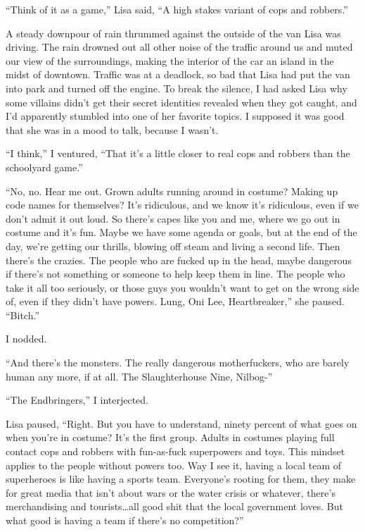 





``Think of it as a game,'' Lisa said, ``A high stakes variant of cops and robbers.''



A steady downpour of rain thrummed against the outside of the van Lisa was driving.  The rain drowned out all other noise of the traffic around us and muted our view of the surroundings, making the interior of the car an island in the midst of downtown.  Traffic was at a deadlock, so bad that Lisa had put the van into park and turned off the engine.  To break the silence, I had asked Lisa why some villains didn't get their secret identities revealed when they got caught, and I'd apparently stumbled into one of her favorite topics.  I supposed it was good that she was in a mood to talk, because I wasn't.



``I think,'' I ventured, ``That it's a little closer to real cops and robbers than the schoolyard game.''



``No, no.  Hear me out.  Grown adults running around in costume?  Making up code names for themselves?  It's ridiculous, and we know it's ridiculous, even if we don't admit it out loud.  So there's capes like you and me, where we go out in costume and it's fun.  Maybe we have some agenda or goals, but at the end of the day, we're getting our thrills, blowing off steam and living a second life.  Then there's the crazies.  The people who are fucked up in the head, maybe dangerous if there's not something or someone to help keep them in line.  The people who take it all too seriously, or those guys you wouldn't want to get on the wrong side of, even if they didn't have powers.  Lung, Oni Lee, Heartbreaker,'' she paused.  ``Bitch.''



I nodded.



``And there's the monsters.  The really dangerous motherfuckers, who are barely human any more, if at all.  The Slaughterhouse Nine, Nilbog-''



``The Endbringers,'' I interjected.



Lisa paused, ``Right.  But you have to understand, ninety percent of what goes on when you're in costume?  It's the first group.  Adults in costumes playing full contact cops and robbers with fun-as-fuck superpowers and toys.  This mindset applies to the people without powers too.  Way I see it, having a local team of superheroes is like having a sports team.  Everyone's rooting for them, they make for great media that isn't about wars or the water crisis or whatever, there's merchandising and tourists\ldots all good shit that the local government loves.  But what good is having a team if there's no competition?''



